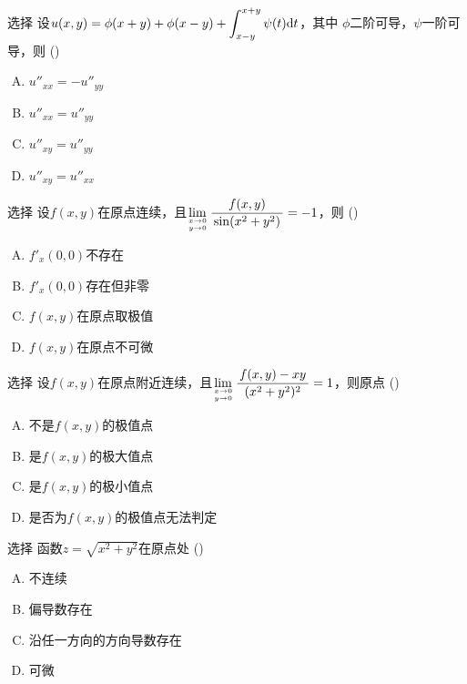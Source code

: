 \begin{frame}{选择}
	\linespread{1.3}
	设$u(x,y)=\phi(x+y)+\phi(x-y)+\displaystyle\int_{x-y}^{x+y}\psi(t)\mathrm{d} t$，其中
	$\phi$二阶可导，$\psi$一阶可导，则
	(\underline{\;})
	\begin{enumerate}[(A)]
	  \item $u''_{xx}=-u''_{yy}$
	  \item $u''_{xx}=u''_{yy}$
	  \item $u''_{xy}=u''_{yy}$
	  \item $u''_{xy}=u''_{xx}$
	\end{enumerate}
\end{frame}

\begin{frame}{选择}
	\linespread{1.3}
	设$f(x,y)$在原点连续，且$\lim\limits_{x\to 0\atop y\to 0}
	\displaystyle\frac{\,{f(x,y)}\,}{\,{\sin(x^2+y^2)}\,}=-1$，则
	(\underline{\;})
	\begin{enumerate}[(A)]
	  \item $f'_x(0,0)$不存在
	  \item $f'_x(0,0)$存在但非零
	  \item $f(x,y)$在原点取极值
	  \item $f(x,y)$在原点不可微
	\end{enumerate}
\end{frame}

\begin{frame}{选择}
	\linespread{1.3}
	设$f(x,y)$在原点附近连续，且$\lim\limits_{x\to 0\atop y\to 0}
	\displaystyle\frac{\,{f(x,y)-xy}\,}{\,{(x^2+y^2)^2}\,}=1$，则原点
	(\underline{\;})
	\begin{enumerate}[(A)]
	  \item 不是$f(x,y)$的极值点
	  \item 是$f(x,y)$的极大值点
	  \item 是$f(x,y)$的极小值点
	  \item 是否为$f(x,y)$的极值点无法判定
	\end{enumerate}
\end{frame}

\begin{frame}{选择}
	\linespread{1.3}
	函数$z=\sqrt{x^2+y^2}$在原点处
	(\underline{\;})
	\begin{enumerate}[(A)]
	  \item 不连续
	  \item 偏导数存在
	  \item 沿任一方向的方向导数存在
	  \item 可微
	\end{enumerate}
	\pause
\end{frame}

